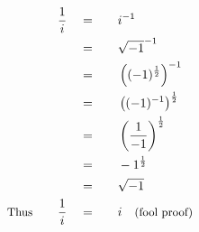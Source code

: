 \begin{alignat*}{5}
&\,&\frac{1}{i}\quad&=\quad&&i^{-1}\\
&\,&\,&=&&\sqrt{-1}^{-1}\\
&\,&\,&=&&\left((-1)^\frac{1}{2}\right)^{-1}\\
&\,&\,&=&&\left((-1)^{-1}\right)^\frac{1}{2}\\
&\,&\,&=&&\left(\frac{1}{-1}\right)^\frac{1}{2}\\
&\,&\,&=&&-1^\frac{1}{2}\\
&\,&\,&=&&\sqrt{-1}\\
&\small\text{Thus}\normalsize\quad&\frac{1}{i}\quad&=&& i\quad\small\text{(fool proof)}
\end{alignat*}
